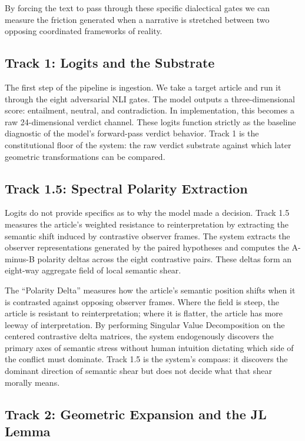 By forcing the text to pass through these specific dialectical gates we can measure the friction generated when a narrative is stretched between two opposing coordinated frameworks of reality.

\subsection{Track 1: Logits and the Substrate}

The first step of the pipeline is ingestion. We take a target article and run it through the eight adversarial NLI gates. The model outputs a three-dimensional score: entailment, neutral, and contradiction. In implementation, this becomes a raw 24-dimensional verdict channel. These logits function strictly as the baseline diagnostic of the model's forward-pass verdict behavior. Track 1 is the constitutional floor of the system: the raw verdict substrate against which later geometric transformations can be compared.

\subsection{Track 1.5: Spectral Polarity Extraction}

Logits do not provide specifics as to why the model made a decision. Track 1.5 measures the article's weighted resistance to reinterpretation by extracting the semantic shift induced by contrastive observer frames. The system extracts the observer representations generated by the paired hypotheses and computes the A-minus-B polarity deltas across the eight contrastive pairs. These deltas form an eight-way aggregate field of local semantic shear. 

The ``Polarity Delta'' measures how the article's semantic position shifts when it is contrasted against opposing observer frames. Where the field is steep, the article is resistant to reinterpretation; where it is flatter, the article has more leeway of interpretation. By performing Singular Value Decomposition on the centered contrastive delta matrices, the system endogenously discovers the primary axes of semantic stress without human intuition dictating which side of the conflict must dominate. Track 1.5 is the system's compass: it discovers the dominant direction of semantic shear but does not decide what that shear morally means.

\subsection{Track 2: Geometric Expansion and the JL Lemma}

